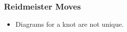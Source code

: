 \documentclass{beamer}
\begin{document}
\begin{frame}
  \frametitle{Reidmeister Moves}
  \begin{itemize}
  \item Diagrams for a knot are not unique.
  \end{itemize}
  \begin{columns}
    \begin{column}{.5\textwidth}
      \begin{center}
      \end{center}
    \end{column}
    \begin{column}{.5\textwidth}
      \begin{center}

\end{center}
\end{column}
\end{columns}
\end{frame}
\end{document}
